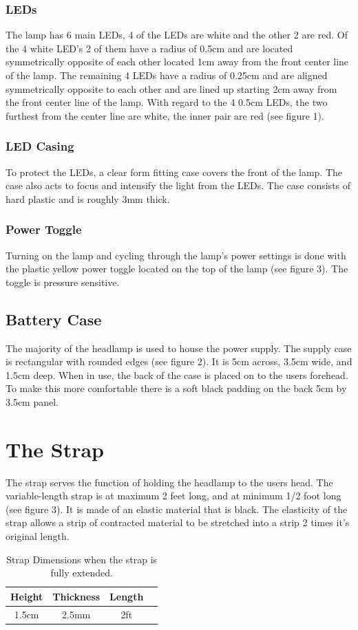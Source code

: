 \documentclass[12pt]{article}
\begin{document}
\subsubsection{LEDs}
The lamp has 6 main LEDs, 4 of the LEDs are white and the other 2 are red. Of the 4 white LED's
2 of them have a radius of 0.5cm and are located symmetrically opposite of each other located 1cm
away from the front center line of the lamp.  The remaining 4 LEDs have a radius of 0.25cm and are
aligned symmetrically opposite to each other and are lined up starting 2cm away from the front
center line of the lamp. With regard to the 4 0.5cm LEDs, the two furthest from the center line are
white, the inner pair are red (see figure 1).

\subsubsection{LED Casing}
To protect the LEDs, a clear form fitting case covers the front of the lamp.  The case also acts to
focus and intensify the light from the LEDs. The case consists of hard plastic and is roughly
3mm thick.

\subsubsection{Power Toggle}
Turning on the lamp and cycling through the lamp's power settings is done with the plastic yellow
power toggle located on the top of the lamp (see figure 3). The toggle is pressure sensitive.

\subsection{Battery Case}
The majority of the headlamp is used to house the power supply. The supply case is rectangular with
rounded edges (see figure 2). It is 5cm across, 3.5cm wide, and 1.5cm deep. When in use, the back of
the case is placed on to the users forehead. To make this more comfortable there is a soft black
padding on the back 5cm by 3.5cm panel.

\section{The Strap}
The strap serves the function of holding the headlamp to the users head. The variable-length strap
is at maximum 2 feet long, and at minimum 1/2 foot long (see figure 3). It is made of an elastic material that
is black. The elasticity of the strap allows a strip of contracted material to be stretched into a
strip 2 times it's original length.
\begin{table}
\begin{center}
\begin{tabular}{ | c | c | c | p{5cm} |}
    \hline
    Height & Thickness & Length \\ \hline
    1.5cm & 2.5mm & 2ft  \\ \hline
\end{tabular}
\end{center}
\caption[Strap Dimensions]{Strap Dimensions when the strap is fully extended.}

\end{table}
\end{document}

